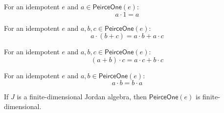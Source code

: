 \begin{theorem}
For an idempotent $e$ and $a \in \mathsf{PeirceOne}(e)$:
\[ a \cdot 1 = a \]
\end{theorem}

\begin{theorem}
For an idempotent $e$ and $a, b, c \in \mathsf{PeirceOne}(e)$:
\[ a \cdot (b + c) = a \cdot b + a \cdot c \]
\end{theorem}

\begin{theorem}
For an idempotent $e$ and $a, b, c \in \mathsf{PeirceOne}(e)$:
\[ (a + b) \cdot c = a \cdot c + b \cdot c \]
\end{theorem}

\begin{theorem}
For an idempotent $e$ and $a, b \in \mathsf{PeirceOne}(e)$:
\[ a \cdot b = b \cdot a \]
\end{theorem}

\begin{proposition}[peirceOneFiniteDimensional]
If $J$ is a finite-dimensional Jordan algebra, then $\mathsf{PeirceOne}(e)$ is finite-dimensional.
\end{proposition}
